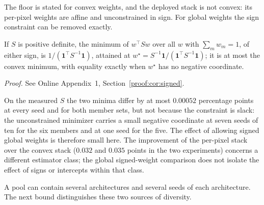 \documentclass[twoside,11pt]{article}
\begin{document}
The floor is stated for convex weights, and the deployed stack is not
convex: its per-pixel weights are affine and unconstrained in sign. For
global weights the sign constraint can be removed exactly.

\begin{corollary}\label{cor:signed}
If $S$ is positive definite, the minimum of $w^\top Sw$ over all $w$ with
$\sum_m w_m=1$, of either sign, is $1/(\mathbf 1^\top S^{-1}\mathbf 1)$,
attained at $w^\star=S^{-1}\mathbf 1/(\mathbf 1^\top S^{-1}\mathbf 1)$; it
is at most the convex minimum, with equality exactly when $w^\star$ has no
negative coordinate.
\end{corollary}
\noindent\emph{Proof.} See Online Appendix~1, Section~\ref{proof:cor:signed}.


On the measured $S$ the two minima differ by at most $0.00052$ percentage points at every
seed and for both member sets, but not because the constraint is slack: the
unconstrained minimizer carries a small negative coordinate at seven seeds of
ten for the six members and at one seed for the five. The effect of allowing signed global weights is
therefore small here. The improvement of the per-pixel stack over the convex
stack ($0.032$ and $0.035$ points in the two experiments) concerns a different estimator class; the global signed-weight comparison does not isolate the effect of signs or intercepts within that class.

A pool can contain several architectures and several seeds of each
architecture. The next bound distinguishes these two sources of diversity.
\end{document}
